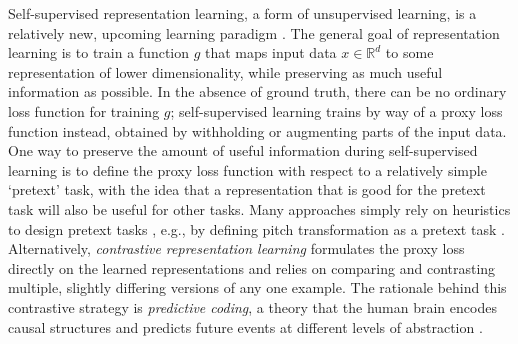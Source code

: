 Self-supervised representation learning, a form of unsupervised learning, is a relatively new, upcoming learning paradigm \cite{dosovitskiy2015discriminative, oord_representation_2019, hjelm_learning_2019,chen_simple_2020}.
The general goal of representation learning is to train a function $g$ that maps input data $x \in \mathbb{R}^d$ to some representation of lower dimensionality, while preserving as much useful information as possible. In the absence of ground truth, there can be no ordinary loss function for training $g$; self-supervised learning trains by way of a proxy loss function instead, obtained by withholding or augmenting parts of the input data. One way to preserve the amount of useful information during self-supervised learning is to define the proxy loss function with respect to a relatively simple `pretext' task, with the idea that a representation that is good for the pretext task will also be useful for other tasks. Many approaches simply rely on heuristics to design pretext tasks \cite{doersch_unsupervised_2015,zhang2016colorful}, e.g., by defining pitch transformation as a pretext task \cite{spice}. Alternatively, \emph{contrastive representation learning} formulates the proxy loss directly on the learned representations and relies on comparing and contrasting multiple, slightly differing versions of any one example. The rationale behind this contrastive strategy is \emph{predictive coding}, a theory that the human brain encodes causal structures and predicts future events at different levels of abstraction \cite{friston_predictive_2009}.



